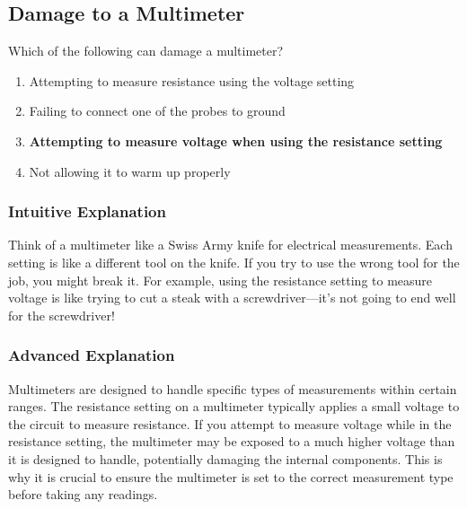 \subsection{Damage to a Multimeter}
\label{T7D06}

\begin{tcolorbox}[colback=gray!10!white,colframe=black!75!black,title=T7D06]
Which of the following can damage a multimeter?
\begin{enumerate}[noitemsep]
    \item Attempting to measure resistance using the voltage setting
    \item Failing to connect one of the probes to ground
    \item \textbf{Attempting to measure voltage when using the resistance setting}
    \item Not allowing it to warm up properly
\end{enumerate}
\end{tcolorbox}

\subsubsection*{Intuitive Explanation}
Think of a multimeter like a Swiss Army knife for electrical measurements. Each setting is like a different tool on the knife. If you try to use the wrong tool for the job, you might break it. For example, using the resistance setting to measure voltage is like trying to cut a steak with a screwdriver—it’s not going to end well for the screwdriver!

\subsubsection*{Advanced Explanation}
Multimeters are designed to handle specific types of measurements within certain ranges. The resistance setting on a multimeter typically applies a small voltage to the circuit to measure resistance. If you attempt to measure voltage while in the resistance setting, the multimeter may be exposed to a much higher voltage than it is designed to handle, potentially damaging the internal components. This is why it is crucial to ensure the multimeter is set to the correct measurement type before taking any readings.
